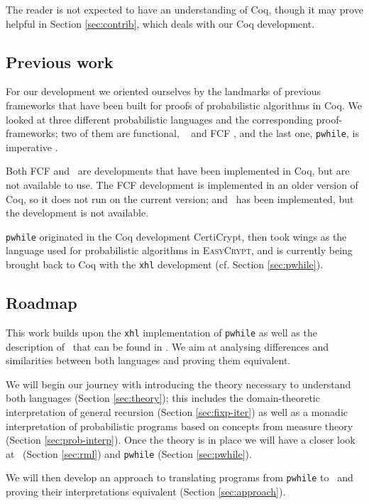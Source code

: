 \documentclass[11pt, leqno, titlepage]{article}
\theoremstyle{definition}
\begin{document}
The reader is not expected to have an understanding of Coq, though it may prove
helpful in Section \ref{sec:contrib}, which deals with our Coq development. 

\subsection{Previous work}
For our development we oriented ourselves by the landmarks of previous frameworks
that have been built for proofs of probabilistic algorithms in Coq. We looked at
three different probabilistic languages and the corresponding proof-frameworks; two
of them are functional, \rml\ \cite{rml-paper} and FCF \cite{fcf}, and the last one,
\texttt{pwhile}, is imperative \cite{easy-crypt}.

Both FCF and \rml\ are developments that have been implemented in Coq, but are not
available to use. The FCF development is implemented in an older version of Coq, so
it does not run on the current version; and \rml\ has been implemented, but the
development is not available.

\texttt{pwhile} originated in the Coq development CertiCrypt, then took wings as the
language used for probabilistic algorithms in \textsc{EasyCrypt}, and is currently
being brought back to Coq with the \texttt{xhl} development (cf. Section
\ref{sec:pwhile}).

\subsection{Roadmap}
This work builds upon the \texttt{xhl} implementation of \texttt{pwhile} as well as
the description of \rml\ that can be found in \cite{rml-paper}. We aim at analysing
differences and similarities between both languages and proving them equivalent.

We will begin our journey with introducing the theory necessary to understand both
languages (Section \ref{sec:theory}); this includes the domain-theoretic
interpretation of general recursion (Section \ref{sec:fixp-iter}) as well as a
monadic interpretation of probabilistic programs based on concepts from measure
theory (Section \ref{sec:prob-interp}). Once the theory is in place we will have a
closer look at \rml\ (Section \ref{sec:rml}) and \texttt{pwhile} (Section
\ref{sec:pwhile}).

We will then develop an approach to translating programs from \texttt{pwhile} to
\rml\ and proving their interpretations equivalent (Section \ref{sec:approach}).
\end{document}

